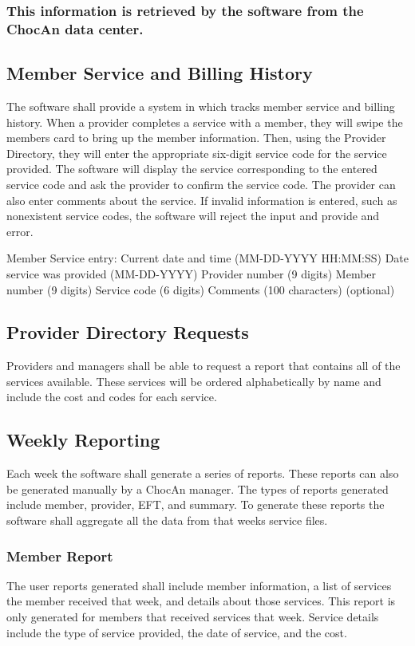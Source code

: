 \documentclass{article}
\begin{document}
\subsubsection{This information is retrieved by the software from the ChocAn data center.}


\subsection{Member Service and Billing History}
The software shall provide a system in which tracks member service and billing history. When a provider completes a service with a member, they will swipe the members card to bring up the member information. Then, using the Provider Directory, they will enter the appropriate six-digit service code for the service provided. The software will display the service corresponding to the entered service code and ask the provider to confirm the service code. The provider can also enter comments about the service. If invalid information is entered, such as nonexistent service codes, the software will reject the input and provide and error. 

Member Service entry:
Current date and time (MM-DD-YYYY HH:MM:SS)
Date service was provided (MM-DD-YYYY)
Provider number (9 digits)
Member number (9 digits)
Service code (6 digits)
Comments (100 characters) (optional)

\subsection{Provider Directory Requests}
Providers and managers shall be able to request a report that contains all of the services available. These services will be ordered alphabetically by name and include the cost and codes for each service.

\subsection{Weekly Reporting}
Each week the software shall generate a series of reports. These reports can also be generated manually by a ChocAn manager. The types of reports generated include member, provider, EFT, and summary. To generate these reports the software shall aggregate all the data from that weeks service files.

\subsubsection{Member Report}
The user reports generated shall include member information, a list of services the member received that week, and details about those services. This report is only generated for members that received services that week. Service details include the type of service provided, the date of service, and the cost.
   
\end{document}
